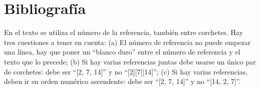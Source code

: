 \documentclass[twocolumn,twoside,a4paper, 10pt]{article}
\begin{document}

\section{Bibliografía}
En el texto se utiliza el número de la referencia, también entre 
corchetes. Hay tres cuestiones a tener en cuenta: (a) El número de 
referencia no puede empezar una línea, hay que poner un ``blanco 
duro'' entre el número de referencia y el texto que lo precede; (b) 
Si hay varias referencias juntas debe usarse un único par de 
corchetes: debe ser ``[2, 7, 14]'' y no ``[2][7][14]''; (c) Si hay 
varias referencias, deben ir en orden numérico ascendente: debe ser  
``[2, 7, 14]'' y no ``[14, 2, 7]''.
\end{document}
